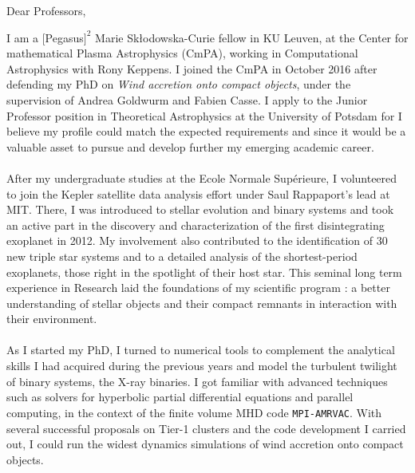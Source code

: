 \documentclass[12pt]{letter}
\begin{document}
 
 
\begin{letter} {}%
      


\date{7\textsuperscript{th} August, 2018}
\opening{Dear Professors,}
 
\thispagestyle{empty}
 
 

\hspace*{0.5cm} I am a $[$Pegasus$]^2$ Marie Sk\l{}odowska-Curie fellow in KU Leuven, at the Center for mathematical Plasma Astrophysics (CmPA), working in Computational Astrophysics with Rony Keppens. I joined the CmPA in October 2016 after defending my PhD on \textit{Wind accretion onto compact objects}, under the supervision of Andrea Goldwurm and Fabien Casse. I apply to the Junior Professor position in Theoretical Astrophysics at the University of Potsdam for I believe my profile could match the expected requirements and since it would be a valuable asset to pursue and develop further my emerging academic career. \\ \\
\hspace*{0.5cm} After my undergraduate studies at the Ecole Normale Sup\'erieure, I volunteered to join the Kepler satellite data analysis effort under Saul Rappaport's lead at MIT. There, I was introduced to stellar evolution and binary systems and took an active part in the discovery and characterization of the first disintegrating exoplanet in 2012. My involvement also contributed to the identification of 30 new triple star systems and to a detailed analysis of the shortest-period exoplanets, those right in the spotlight of their host star. This seminal long term experience in Research laid the foundations of my scientific program : a better understanding of stellar objects and their compact remnants in interaction with their environment.\\ \\
\hspace*{0.5cm} As I started my PhD, I turned to numerical tools to complement the analytical skills I had acquired during the previous years and model the turbulent twilight of binary systems, the X-ray binaries. I got familiar with advanced techniques such as solvers for hyperbolic partial differential equations and parallel computing, in the context of the finite volume MHD code \texttt{MPI-AMRVAC}. With several successful proposals on Tier-1 clusters and the code development I carried out, I could run the widest dynamics simulations of wind accretion onto compact objects.\\


\end{letter}
\end{document}
